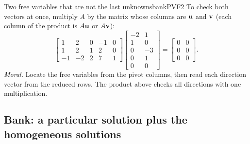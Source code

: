 \documentclass[11pt]{article}
\begin{document}
\begin{exmp}{Two free variables that are not the last unknowns}{bankPVF2}
To check both vectors at once, multiply $A$ by the matrix whose columns are $\mathbf{u}$ and $\mathbf{v}$ (each column of the product is $A\mathbf{u}$ or $A\mathbf{v}$):
\[
\begin{bmatrix}1&2&0&-1&0\\1&2&1&2&0\\-1&-2&2&7&1\end{bmatrix}\begin{bmatrix}-2&1\\1&0\\0&-3\\0&1\\0&0\end{bmatrix}=\begin{bmatrix}0&0\\0&0\\0&0\end{bmatrix}.
\]
\emph{Moral.} Locate the free variables from the pivot columns, then read each direction vector from the reduced rows. The product above checks all directions with one multiplication.
\end{exmp}

\subsection*{Bank: a particular solution plus the homogeneous solutions}
\end{document}
